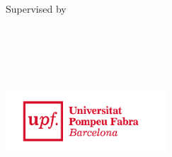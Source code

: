 \begin{titlepage}
    \begin{center}
        \large

        \hfill

        \vfill

        \begingroup
            \color{Maroon}\spacedallcaps{\myTitle} \\
		\spacedlowsmallcaps{\mySubtitle} \\ \bigskip
        \endgroup

        \spacedlowsmallcaps{\myName} \\
        \medskip
        Supervised by \\
		\spacedlowsmallcaps{\myProf} \\
        \vfill



        \myDegree \\
        \myDepartment \\
        \myUni \\ 
        \medskip
 
        \includegraphics[width=6cm]{gfx/upf-logo} \\

        
        \bigskip

        \myTime%

        \vfill

    \end{center}
\end{titlepage}
